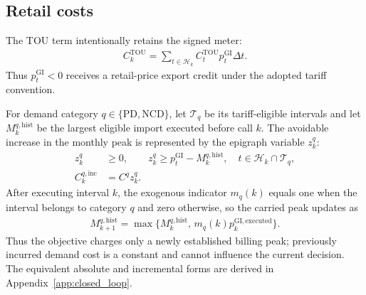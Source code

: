 \documentclass[final,5p,times]{elsarticle}
\newcommand{\dt}{\Delta t}
\newcommand{\GI}{\mathrm{GI}}
\newcommand{\TOU}{\mathrm{TOU}}
\newcommand{\PD}{\mathrm{PD}}
\newcommand{\NCD}{\mathrm{NCD}}
\newcommand{\hist}{\mathrm{hist}}
\newcommand{\calT}{\mathcal{T}}
\newcommand{\calH}{\mathcal{H}}
\begin{document}
\subsection{Retail costs}
The TOU term intentionally retains the signed meter:
\begin{align}
C_k^{\TOU}
=\sum_{t\in\calH_k}C_t^{\TOU}p_t^{\GI}\dt. \label{eq:tou}
\end{align}
Thus $p_t^{\GI}<0$ receives a retail-price export credit under the adopted
tariff convention.

For demand category $q\in\{\PD,\NCD\}$, let $\calT_q$ be its tariff-eligible
intervals and let $M_k^{q,\hist}$ be the largest eligible import executed
before call $k$. The avoidable increase in the monthly peak is represented by
the epigraph variable $z_k^q$:
\begin{align}
z_k^q&\ge0, \qquad
z_k^q\ge p_t^{\GI}-M_k^{q,\hist},
\quad t\in\calH_k\cap\calT_q, \label{eq:demand_epi}\\
C_k^{q,\mathrm{inc}}&=C^q z_k^q. \label{eq:demand_inc}
\end{align}
After executing interval $k$, the exogenous indicator $m_q(k)$ equals one when
the interval belongs to category $q$ and zero otherwise, so the carried peak
updates as
\begin{align}
M_{k+1}^{q,\hist}
=\max\{M_k^{q,\hist},\,m_q(k)p_k^{\GI,\mathrm{executed}}\}. \label{eq:threshold_update}
\end{align}
Thus the objective charges only a newly established billing peak; previously
incurred demand cost is a constant and cannot influence the current decision.
The equivalent absolute and incremental forms are derived in
Appendix~\ref{app:closed_loop}.
\end{document}
